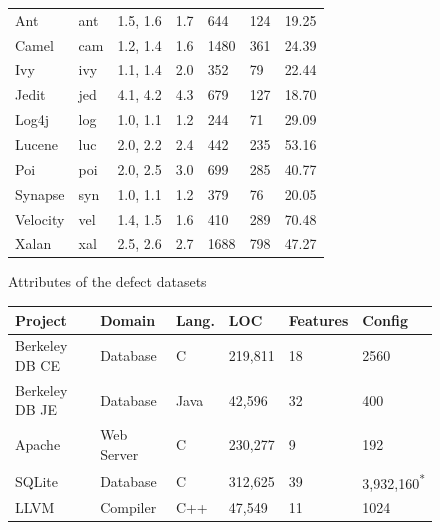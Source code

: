 \documentclass[conference]{IEEEtran}
\begin{document}
{\begin{figure}[!tb]
\begin{center}
{\begin{tabular}{l@{~~~}l@{~~~}l@{~~~}l@{~~~}l@{~~~}l@{~~~}l@{~~}}
Ant & ant & 1.5, 1.6  &1.7 & 644&124&19.25\\

Camel & cam & 1.2, 1.4 & 1.6 & 1480&361 & 24.39\\

Ivy & ivy & 1.1, 1.4 & 2.0  & 352 & 79 & 22.44\\

Jedit & jed & 4.1, 4.2 & 4.3 & 679 & 127 & 18.70\\

Log4j & log & 1.0, 1.1 & 1.2 & 244 & 71 & 29.09\\

Lucene & luc & 2.0, 2.2 & 2.4 & 442 & 235 & 53.16\\

Poi & poi & 2.0, 2.5 & 3.0 & 699 & 285 & 40.77\\

Synapse & syn & 1.0, 1.1 & 1.2 & 379 & 76 & 20.05\\

Velocity & vel & 1.4, 1.5 & 1.6 & 410& 289 & 70.48\\

Xalan & xal &2.5, 2.6 &2.7 & 1688 & 798 & 47.27\\\hline
\end{tabular}}
\end{center}
\caption{Attributes of the defect datasets}\label{fig:ck}
\end{figure}

\begin{figure}[!hbp]
  \renewcommand{\baselinestretch}{1}\begin{center}
{\scriptsize
\begin{tabular}{llllll}
  \hline
  \rowcolor{lightgray}
Project & Domain & Lang. & LOC & Features & Config\\\hline

Berkeley DB CE & Database & C & 219,811 & 18 & 2560\\

Berkeley DB JE & Database & Java & 42,596 & 32  & 400\\

Apache & Web Server & C & 230,277 & 9 & 192\\

SQLite & Database & C & 312,625 & 39 & 3,932,160\textsuperscript{*}\\

LLVM & Compiler & C++ & 47,549 & 11 & 1024\\


\end{tabular}}
\end{center}
\end{figure}}
\end{document}
